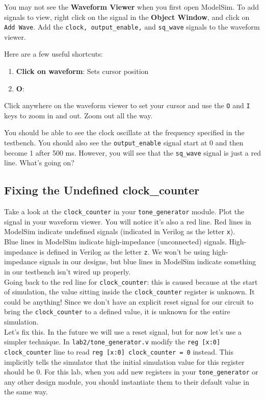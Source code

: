 \documentclass[11pt]{article}
\begin{document}
You may not see the \textbf{Waveform Viewer} when you first open ModelSim. To add signals to view, right click on the signal in the \textbf{Object Window}, and click on \verb|Add Wave|. Add the \verb|clock, output_enable,| and \verb|sq_wave| signals to the waveform viewer.

Here are a few useful shortcuts:

\begin{enumerate}
	\item \textbf{Click on waveform}: Sets cursor position
	\item \textbf{O}:
\end{enumerate}

Click anywhere on the waveform viewer to set your cursor and use the \verb|O| and \verb|I| keys to zoom in and out. Zoom out all the way.

You should be able to see the clock oscillate at the frequency specified in the testbench. You should also see the \verb|output_enable| signal start at 0 and then become 1 after 500 ms. However, you will see that the \verb|sq_wave| signal is just a red line. What's going on?

\subsection{Fixing the Undefined clock\_counter}

Take a look at the \verb|clock_counter| in your \verb|tone_generator| module. Plot the signal in your waveform viewer. You will notice it's also a red line. Red lines in ModelSim indicate undefined signals (indicated in Verilog as the letter \verb|x|). \\

Blue lines in ModelSim indicate high-impedance (unconnected) signals. High-impedance is defined in Verilog as the letter \verb|z|. We won't be using high-impedance signals in our designs, but blue lines in ModelSim indicate something in our testbench isn't wired up properly.\\

Going back to the red line for \verb|clock_counter|: this is caused because at the start of simulation, the value sitting inside the \verb|clock_counter| register is unknown. It could be anything! Since we don't have an explicit reset signal for our circuit to bring the \verb|clock_counter| to a defined value, it is unknown for the entire simulation.\\

Let's fix this. In the future we will use a reset signal, but for now let's use a simpler technique. In \verb|lab2/tone_generator.v| modify the \verb|reg [x:0] clock_counter| line to read \verb|reg [x:0] clock_counter = 0| instead. This implicitly tells the simulator that the initial simulation value for this register should be 0. For this lab, when you add new registers in your \verb|tone_generator| or any other design module, you should instantiate them to their default value in the same way.\\
\end{document}
